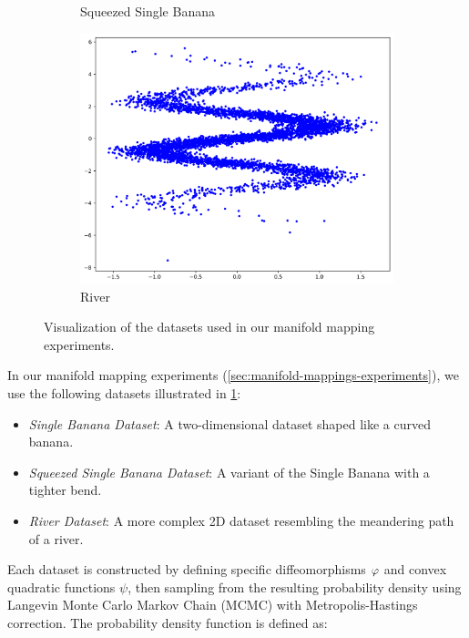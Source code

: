 \begin{figure}[ht]
\begin{subfigure}[b]{0.32\textwidth}
\caption{Squeezed Single Banana}
\end{subfigure}
\begin{subfigure}[b]{0.32\textwidth}
\includegraphics[width=\textwidth]{chapter5/results/visualisations/datasets/river.png}
\caption{River}
\end{subfigure}
\caption{Visualization of the datasets used in our manifold mapping experiments.}
\label{fig:datasets}
\end{figure}

In our manifold mapping experiments (\ref{sec:manifold-mappings-experiments}), we use the following datasets illustrated in \ref{fig:datasets}:

\begin{itemize}
    \item \textit{Single Banana Dataset}: A two-dimensional dataset shaped like a curved banana.
    \item \textit{Squeezed Single Banana Dataset}: A variant of the Single Banana with a tighter bend.
    \item \textit{River Dataset}: A more complex 2D dataset resembling the meandering path of a river.
\end{itemize}

Each dataset is constructed by defining specific diffeomorphisms $\varphi$ and convex quadratic functions $\psi$, then sampling from the resulting probability density using Langevin Monte Carlo Markov Chain (MCMC) with Metropolis-Hastings correction. The probability density function is defined as:

